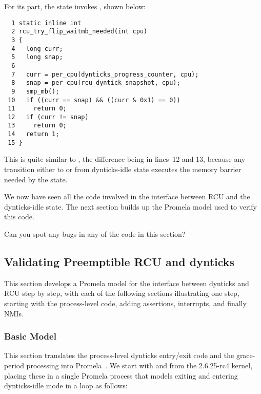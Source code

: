 For its part, the  state
invokes , shown below:

{ \scriptsize
\begin{verbatim}
  1 static inline int
  2 rcu_try_flip_waitmb_needed(int cpu)
  3 {
  4   long curr;
  5   long snap;
  6
  7   curr = per_cpu(dynticks_progress_counter, cpu);
  8   snap = per_cpu(rcu_dyntick_snapshot, cpu);
  9   smp_mb();
 10   if ((curr == snap) && ((curr & 0x1) == 0))
 11     return 0;
 12   if (curr != snap)
 13     return 0;
 14   return 1;
 15 }
\end{verbatim}
}

This is quite similar to ,
the difference being in lines~12 and 13, because any transition
either to or from dynticks-idle state executes the memory barrier
needed by the  state.

We now have seen all the code involved in the interface between
RCU and the dynticks-idle state.
The next section builds up the Promela model used to verify this
code.

\QuickQuiz{}
	Can you spot any bugs in any of the code in this section?
 \QuickQuizEnd

\subsection{Validating Preemptible RCU and dynticks}
\label{app:formal:Validating Preemptible RCU and dynticks}

This section develops a Promela model for the interface between
dynticks and RCU step by step, with each of the following sections
illustrating one step, starting with the process-level code,
adding assertions, interrupts, and finally NMIs.

\subsubsection{Basic Model}
\label{app:formal:Basic Model}

This section translates the process-level dynticks entry/exit
code and the grace-period processing into
Promela~\cite{Holzmann03a}.
We start with  and
from the 2.6.25-rc4 kernel, placing these in a single Promela
process that models exiting and entering dynticks-idle mode in
a loop as follows:

